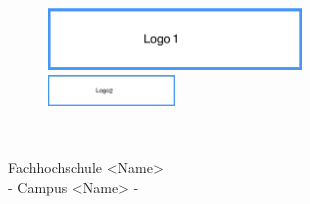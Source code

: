 


%


\thispagestyle{empty}


\begin{figure}[t]
 \centering
 \includegraphics[width=0.6\textwidth]{abb/logo1}
~~~~~~~~~~
 \includegraphics[width=0.3\textwidth]{abb/logo2}
\end{figure}


\begin{verbatim}


\end{verbatim}

\begin{center}
\Large{Fachhochschule <Name>}\\
\Large{- Campus <Name> -}\\
\end{center}


